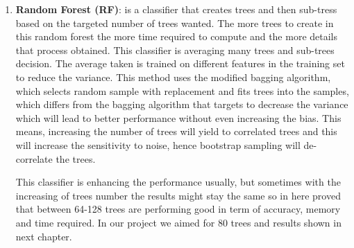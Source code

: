\begin{enumerate}
\item \textbf{Random Forest (RF)}: is a classifier that creates trees and then sub-tress based on the targeted number of trees wanted.
The more trees to create in this random forest the more time required to compute and the more details that process obtained.
This classifier is averaging many trees and sub-trees decision.
The average taken is trained on different features in the training set to reduce the variance.
This method uses the modified bagging algorithm, which selects random sample with replacement and fits trees into the samples, which differs from the bagging algorithm that targets to decrease the variance which will lead to better performance without even increasing the bias.
This means, increasing the number of trees will yield to correlated trees and this will increase the sensitivity to noise, hence bootstrap sampling will de-correlate the trees.

This classifier is enhancing the performance usually, but sometimes with the increasing of trees number the results might stay the same so in here \cite{oshiro2012many} proved that between 64-128 trees are performing good in term of accuracy, memory and time required.
In our project we aimed for 80 trees and results shown in next chapter. 
\end{enumerate} 
